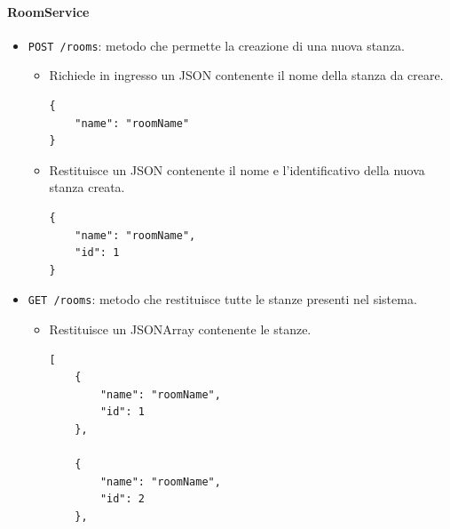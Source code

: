 \documentclass[a4paper]{article}
\begin{document}
\paragraph{RoomService}
\begin{itemize}
    \item \texttt{POST /rooms}: metodo che permette la creazione di una nuova stanza.
    \begin{itemize}
        \item Richiede in ingresso un JSON contenente il nome della stanza da creare.
        \begin{verbatim}
{
    "name": "roomName"
}
        \end{verbatim}
        \item Restituisce un JSON contenente il nome e l'identificativo della nuova stanza creata.
        \begin{verbatim}
{
    "name": "roomName",
    "id": 1
}
        \end{verbatim}
    \end{itemize}
    \item \texttt{GET /rooms}: metodo che restituisce tutte le stanze presenti nel sistema.
    \begin{itemize}
        \item Restituisce un JSONArray contenente le stanze.
        \begin{verbatim}
[
    {
        "name": "roomName",
        "id": 1
    },
    
    {
        "name": "roomName",
        "id": 2
    },
    

\end{verbatim}
\end{itemize}
\end{itemize}
\end{document}
